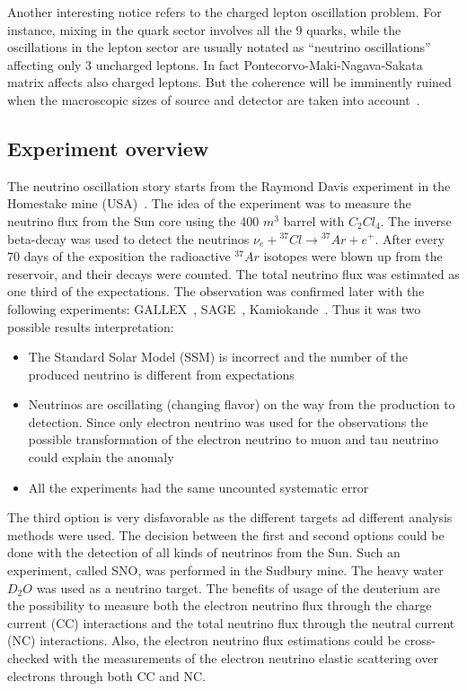 \documentclass[../main.tex]{subfiles}
\begin{document}
Another interesting notice refers to the charged lepton oscillation problem. For instance, mixing in the quark sector involves all the 9 quarks, while the oscillations in the lepton sector are usually notated as ``neutrino oscillations'' affecting only 3 uncharged leptons. In fact Pontecorvo-Maki-Nagava-Sakata matrix affects also charged leptons. But the coherence will be imminently ruined when the macroscopic sizes of source and detector are taken into account~\cite{Akhmedov2007}.

\subsection{Experiment overview}
\label{sec:intro:osc_exp}
The neutrino oscillation story starts from the Raymond Davis experiment in the Homestake mine (USA)~\cite{Davis1968}. The idea of the experiment was to measure the neutrino flux from the Sun core using the 400 ${m^3}$ barrel with ${C_2Cl_4}$. The inverse beta-decay was used to detect the neutrinos $\nu_e+{}^{37}Cl\to{}^{37}Ar+e^+$. After every 70 days of the exposition the radioactive ${}^{37}Ar$ isotopes were blown up from the reservoir, and their decays were counted. The total neutrino flux was estimated as one third of the expectations. The observation was confirmed later with the following experiments: GALLEX~\cite{Kirsten1999}, SAGE~\cite{Abdurashitov1999}, Kamiokande~\cite{Oyama1989}. Thus it was two possible results interpretation:
\begin{itemize}
  \item The Standard Solar Model (SSM) is incorrect and the number of the produced neutrino is different from expectations
  \item Neutrinos are oscillating (changing flavor) on the way from the production to detection. Since only electron neutrino was used for the observations the possible transformation of the electron neutrino to muon and tau neutrino could explain the anomaly
  \item All the experiments had the same uncounted systematic error
\end{itemize}
The third option is very disfavorable as the different targets ad different analysis methods were used. The decision between the first and second options could be done with the detection of all kinds of neutrinos from the Sun. Such an experiment, called SNO, was performed in the Sudbury mine. The heavy water $D_2O$ was used as a neutrino target. The benefits of usage of the deuterium are the possibility to measure both the electron neutrino flux through the charge current (CC) interactions and the total neutrino flux through the neutral current (NC) interactions. Also, the electron neutrino flux estimations could be cross-checked with the measurements of the electron neutrino elastic scattering over electrons through both CC and NC.
\end{document}
